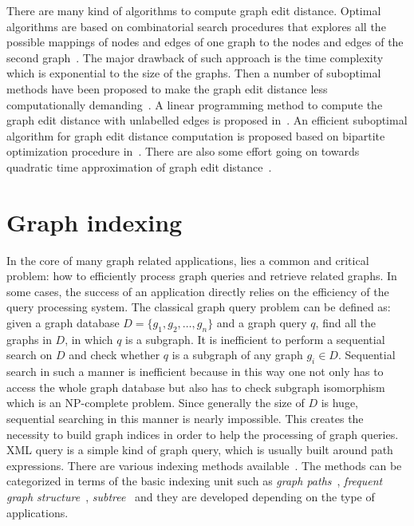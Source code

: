 There are many kind of algorithms to compute graph edit distance. Optimal algorithms are based on combinatorial search procedures that explores all the possible mappings of nodes and edges of one graph to the nodes and edges of the second graph~\cite{Bunke1983}. The major drawback of such approach is the time complexity which is exponential to the size of the graphs. Then a number of suboptimal methods have been proposed to make the graph edit distance less computationally demanding~\cite{Neuhaus2004}. A linear programming method to compute the graph edit distance with unlabelled edges is proposed in~\cite{Justice2006}. An efficient suboptimal algorithm for graph edit distance computation is proposed based on bipartite optimization procedure in~\cite{Riesen2007a}. There are also some effort going on towards quadratic time approximation of graph edit distance~\cite{Fischer2013}.

\section{Graph indexing}
\label{sec:gm:gi}
In the core of many graph related applications, lies a common and critical problem: how to efficiently process graph queries and retrieve related graphs. In some cases, the success of an application directly relies on the efficiency of the query processing system. The classical graph query problem can be defined as: given a graph database $D=\lbrace g_1,g_2,\ldots,g_n\rbrace$ and a graph query $q$, find all the graphs in $D$, in which $q$ is a subgraph. It is inefficient to perform a sequential search on $D$ and check whether $q$ is a subgraph of any graph $g_i\in D$. Sequential search in such a manner is inefficient because in this way one not only has to access the whole graph database but also has to check subgraph isomorphism which is an NP-complete problem. Since generally the size of $D$ is huge, sequential searching in this manner is nearly impossible. This creates the necessity to build graph indices in order to help the processing of graph queries. XML query is a simple kind of graph query, which is usually built around path expressions. There are various indexing methods available~\cite{Sossa1992,Giugno2002,Kaushik2002,Yan2004,Shokoufandeh2005,Zhang2007a}. The methods can be categorized in terms of the basic indexing unit such as \emph{graph paths}~\cite{Giugno2002}, \emph{frequent graph structure}~\cite{Yan2004}, \emph{subtree}~\cite{Shokoufandeh2005} and they are developed depending on the type of applications.

